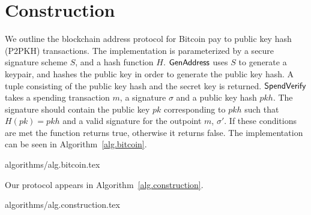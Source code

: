 \section{Construction}\label{section:construction}

We outline the blockchain address protocol for Bitcoin pay to public key hash (P2PKH) transactions. The implementation is parameterized by a secure signature scheme $S$, and a hash function $H$.
$\mathsf{GenAddress}$ uses $S$ to generate a keypair, and hashes the public key in order to generate the public key hash. A tuple consisting of the public key hash and the secret key is returned.
$\mathsf{SpendVerify}$ takes a spending transaction $m$, a signature $\sigma$ and a public key hash $pkh$. The signature should contain the public key $pk$ corresponding to $pkh$ such that $H(pk) = pkh$ and a valid signature for the outpoint $m$, $\sigma'$. If these conditions are met the function returns true, otherwise it returns false.
The implementation can be seen in Algorithm~\ref{alg.bitcoin}.

{algorithms/alg.bitcoin.tex}

Our protocol appears in Algorithm~\ref{alg.construction}.

{algorithms/alg.construction.tex}
